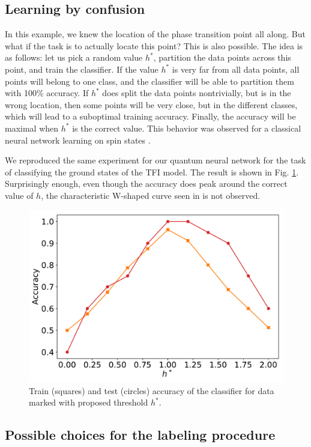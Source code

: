 \subsection{Learning by confusion}
In this example, we knew the location of the phase transition point all along. But what if the task is to actually locate this point? This is also possible. The idea is as follows: let us pick a random value $h^*$, partition the data points across this point, and train the classifier. If the value $h^*$ is very far from all data points, all points will belong to one class, and the classifier will be able to partition them with 100\% accuracy. If $h^*$ does split the data points nontrivially, but is in the wrong location, then some points will be very close, but in the different classes, which will lead to a suboptimal training accuracy. Finally, the accuracy will be maximal when $h^*$ is the correct value. This behavior was observed for a classical neural network learning on spin states \cite{van_nieuwenburg_learning_2017}.

We reproduced the same experiment for our quantum neural network for the task of classifying the ground states of the TFI model. The result is shown in Fig. \ref{fig:learning_by_confusion}. Surprisingly enough, even though the accuracy does peak around the correct value of $h$, the characteristic W-shaped curve seen in \cite{van_nieuwenburg_learning_2017} is not observed. 

\begin{figure}
    \centering
    \includegraphics[width=0.7\linewidth]{figures/acc_confusion_2.pdf}
    \caption{Train (squares) and test (circles) accuracy of the classifier for data marked with proposed threshold $h^*$.}
    \label{fig:learning_by_confusion}
\end{figure}


\subsection{Possible choices for the labeling procedure}

